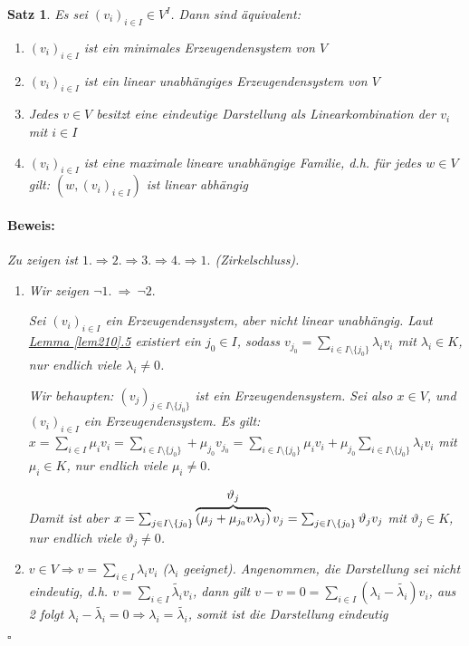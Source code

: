 \documentclass{report}
\newcommand{\lb}{\lambda}
\theoremstyle{customrem}
\theoremstyle{customdef}
\newtheorem{satz}[definition]{Satz}
\renewenvironment{proof}{\vspace{-.75cm}\paragraph{Beweis: }}{\vspace{-.5cm}\hfill$\square$}
\begin{document}
	\begin{satz}
		Es sei $(v_i)_{i\in I} \in V^I$. Dann sind äquivalent:
		\begin{enumerate}
			\item $(v_i)_{i \in I}$ ist ein minimales Erzeugendensystem von $V$
			\item $(v_i)_{i \in I}$ ist ein linear unabhängiges Erzeugendensystem von $V$
			\item Jedes $v \in V$ besitzt eine eindeutige Darstellung als Linearkombination der $v_i$ mit $i \in I$
			\item $(v_i)_{i \in I}$ ist eine maximale lineare unabhängige Familie, d.h. für jedes $w \in V$ gilt: $(w, (v_i)_{i \in I})$ ist linear abhängig\\
		\end{enumerate}
		
		\begin{proof}
			Zu zeigen ist $1. \Rightarrow 2. \Rightarrow 3. \Rightarrow 4. \Rightarrow 1.$ (Zirkelschluss).
			\begin{enumerate}[leftmargin=1.9cm]
				\item[1. $\Rightarrow$ 2. ] Wir zeigen $\neg1.\ \Rightarrow\ \neg 2.$
				
					 Sei $(v_i)_{i\in I}$ ein Erzeugendensystem, aber nicht linear unabhängig. Laut \hyperref[lem210]{Lemma \ref{lem210}.5} existiert ein $j_0\in I$, sodass $v_{j_0} = \sum_{i\in I\setminus\{j_0\}} \lb_i v_i$ mit $\lb_i\in K$, nur endlich viele $\lb_i\not=0$. 
					 
					 Wir behaupten: $(v_j)_{j\in I\setminus\{j_0\}}$ ist ein Erzeugendensystem. Sei also $x\in V$, und $(v_i)_{i\in I}$ ein Erzeugendensystem. Es gilt: $x=\sum_{i\in I}\mu_iv_i = \sum_{i\in I\setminus\{j_0\}} + \mu_{j_0}v_{j_0} = \sum_{i\in I\setminus\{j_0\}}\mu_i v_i + \mu_{j_0}\sum_{i\in I\setminus\{j_0\}} \lb_i v_i$ mit $\mu_i\in K$, nur endlich viele $\mu_i \not= 0$. 
					 
					 Damit ist aber $x=\sum_{j\in I\setminus\{j_0\}}\overbrace{(\mu_j+\mu_{j_0}v\lb_j)}^{\mathlarger{\mathlarger{\vartheta_j}}}v_j = \sum_{j\in I\setminus\{j_0\}} \vartheta_j v_j$ mit $\vartheta_j\in K$, nur endlich viele $\vartheta_j\not=0$.
					 
				\item[2. $\Rightarrow$ 3. ] $v \in V \Rightarrow v = \sum_{i \in I}\lb_i v_i$ ($\lb_i$ geeignet). Angenommen, die Darstellung sei nicht eindeutig, d.h. $v = \sum_{i \in I}\tilde{\lb_i} v_i$, dann gilt $v - v = 0 = \sum_{i \in I} (\lb_i - \tilde{\lb_i}) v_i$, aus 2 folgt $\lb_i - \tilde{\lb_i} = 0 \Rightarrow \lb_i = \tilde{\lb_i}$, somit ist die Darstellung eindeutig
				

\end{enumerate}
\end{proof}
\end{satz}
\end{document}
